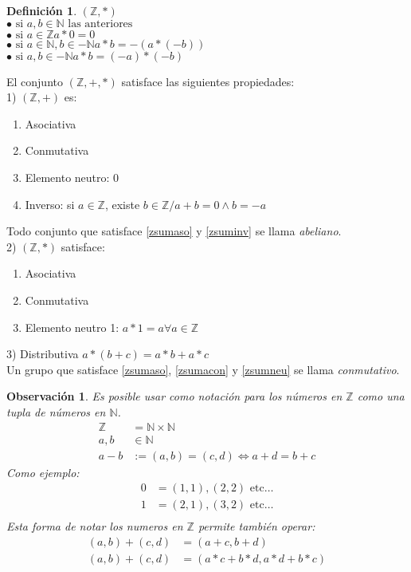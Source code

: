 \documentclass[9pt,a4paper,draft]{article}
\theoremstyle{definition}
\newtheorem{defi}{Definición}
\theoremstyle{plain}
\newtheorem{obs}{Observación}
\begin{document}
\begin{defi} $(\mathbb{Z}, *)$\\
$\bullet\text{ si } a,b\in{\mathbb{N}}\text{ las anteriores}$\\
$\bullet\text{ si } a\in{\mathbb{Z}} a*0=0$\\
$\bullet\text{ si } a\in{\mathbb{N}}, b\in{-\mathbb{N}} a*b=-(a*(-b))$\\
$\bullet\text{ si } a,b\in{-\mathbb{N}} a*b=(-a)*(-b)$
\end{defi}

El conjunto $(\mathbb{Z}, +, *)$ satisface las siguientes propiedades:\\

1) $(\mathbb{Z}, +)$ es:
\begin{enumerate}
\item Asociativa \label{zsumaso}
\item Conmutativa \label{zsumacon}
\item Elemento neutro: 0 \label{zsumneu}
\item Inverso: si $a\in{\mathbb{Z}}$, existe $b\in{\mathbb{Z}}/a+b=0 \land b=-a$ \label{zsuminv}
\end{enumerate}

Todo conjunto que satisface \ref{zsumaso} y \ref{zsuminv} se llama {\itshape abeliano}. \\

2) $(\mathbb{Z}, *)$ satisface:\\
\begin{enumerate}
\item Asociativa
\item Conmutativa
\item Elemento neutro 1: $a*1=a\forall{a}\in{\mathbb{Z}}$
\end{enumerate}

3) Distributiva $a*(b+c)=a*b+a*c$\\

Un grupo que satisface \ref{zsumaso}, \ref{zsumacon} y \ref{zsumneu} se llama {\itshape conmutativo}. 

\begin{obs} Es posible usar como notación para los números en $\mathbb{Z}$ como una tupla de números en $\mathbb{N}$.
\begin{align*}
\mathbb{Z} &= \mathbb{N}\times\mathbb{N}\\
a,b &\in{\mathbb{N}}\\
a-b &:= (a,b)=(c,d)\iff a+d=b+c
\end{align*}
Como ejemplo:
\begin{align*}
0 &= (1,1),(2,2) \text{ etc}\dots\\
1 &= (2,1),(3,2) \text{ etc}\dots\\
\end{align*}
Esta forma de notar los numeros en $\mathbb{Z}$ permite también operar:
\begin{align*}
(a,b)+(c,d)&=(a+c,b+d)\\
(a,b)+(c,d)&=(a*c+b*d,a*d+b*c)
\end{align*}
\end{obs}
\end{document}
